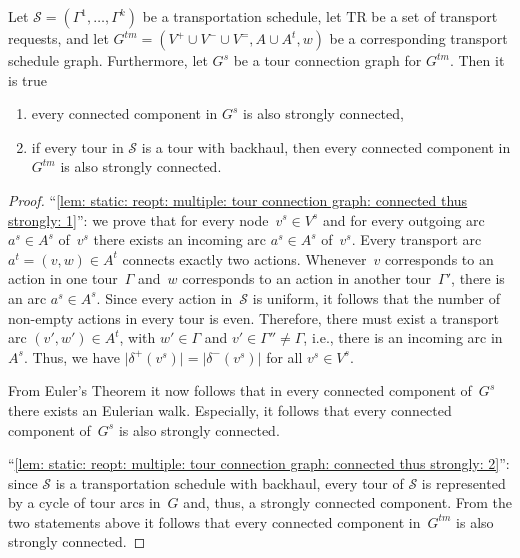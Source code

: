 \documentclass[english]{llncs}
\numberwithin{sublemma}{lemma}
\newcommand{\abs}[1]{\ensuremath{\lvert #1 \rvert}}
\newcommand{\tourd}{\ensuremath{\Gamma}}
\newcommand{\sched}{\mathcal{S}}
\newcommand{\schedule}{\sched}
\newcommand{\TR}{\mathrm{TR}}
\newcommand{\Vpick}{{V^+}}
\newcommand{\Vdrop}{{V^-}}
\newcommand{\Vbal}{{V^=}}
\begin{document}
\begin{lemma}\label{lem: static: reopt: multiple: tour connection graph: connected thus strongly}
Let $\schedule = (\tourd^1, \dotsc, \tourd^k)$ be a transportation schedule,
let $\TR$ be a set of transport requests, and let $G^{tm} = (\Vpick \cup \Vdrop \cup \Vbal, A \cup A^t, w)$ be a corresponding transport schedule graph.
Furthermore, let $G^s$ be a tour connection graph for $G^{tm}$.
Then it is true
\begin{enumerate}
 \item\label{lem: static: reopt: multiple: tour connection graph: connected thus strongly: 1} every connected component in $G^s$ is also strongly connected,
 \item\label{lem: static: reopt: multiple: tour connection graph: connected thus strongly: 2} if every tour in $\schedule$ is a tour with backhaul, then every connected component in $G^{tm}$ is also strongly connected.
\end{enumerate}
\end{lemma}



\begin{proof}
``\ref{lem: static: reopt: multiple: tour connection graph: connected thus strongly: 1}'': 
we prove that for every node~$v^s \in V^s$ and for every outgoing arc $a^s \in A^s$ of~$v^s$ there exists an incoming arc $a^s \in A^s$ of~$v^s$.
Every transport arc $a^t = (v, w) \in A^t$ connects exactly two actions.
Whenever~$v$ corresponds to an action in one tour~$\tourd$ and~$w$ corresponds to an action in another tour~$\tourd'$, there is an arc $a^s \in A^s$.
Since every action in~$\schedule$ is uniform, it follows that the number of non-empty actions in every tour is even.
Therefore, there must exist a transport arc $(v', w') \in A^t$, with $w' \in \tourd$ and $v' \in \tourd'' \neq \tourd$, i.e., there is an incoming arc in $A^s$.
Thus, we have $\abs{\delta^+(v^s)} = \abs{\delta^-(v^s)}$ for all $v^s \in V^s$.


From Euler's Theorem it now follows that in every connected component of~$G^s$ there exists an Eulerian walk.
Especially, it follows that every connected component of~$G^s$ is also strongly connected.


``\ref{lem: static: reopt: multiple: tour connection graph: connected thus strongly: 2}'': 
since $\schedule$ is a transportation schedule with backhaul, every tour of $\schedule$ is represented by a cycle of tour arcs in~$G$ and, thus, a strongly connected component.
From the two statements above it follows that every connected component in~$G^{tm}$ is also strongly connected.
\end{proof}
\end{document}
